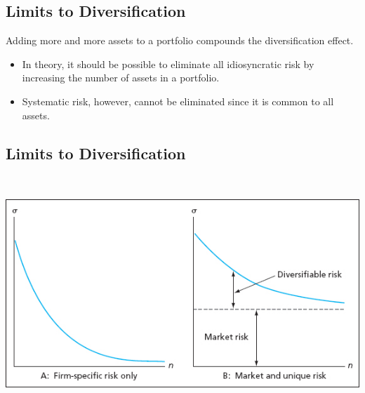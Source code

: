 \documentclass[letterpaper,10pt,english]{sphinxmanual}
\begin{document}
\subsection{Limits to Diversification}
\label{portfolioOpt:limits-to-diversification}
Adding more and more assets to a portfolio compounds the
diversification effect.
\begin{itemize}
\item {} 
In theory, it should be possible to eliminate all idiosyncratic risk
by increasing the number of assets in a portfolio.

\end{itemize}
\begin{itemize}
\item {} 
Systematic risk, however, cannot be eliminated since it is common to
all assets.

\end{itemize}


\subsection{Limits to Diversification}
\label{portfolioOpt:id3}
$\qquad$

\includegraphics[width=6in]{bod34698_0601_lg.jpg}
\end{document}
